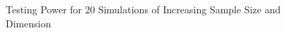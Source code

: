 \documentclass[12pt]{article}
\begin{document}
\begin{figure}[htbp]
{}
\hfil
{}
\caption{Testing Power for 20 Simulations of Increasing Sample Size and Dimension}
\label{figSim1}
\end{figure}

\end{document}

